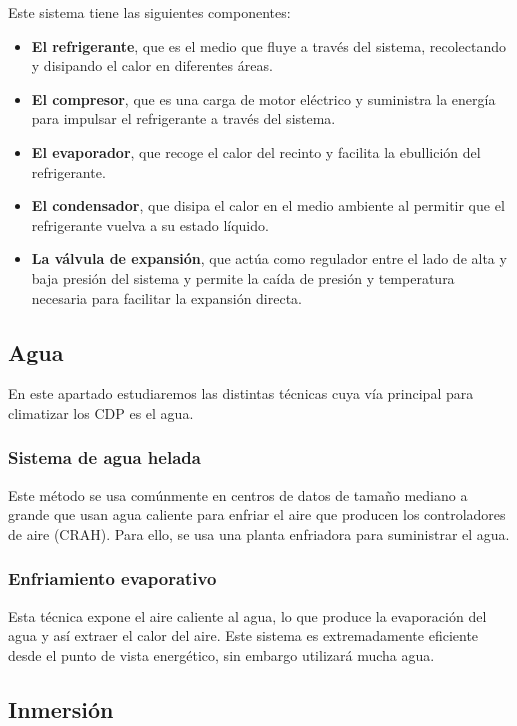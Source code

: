 Este sistema tiene las siguientes componentes:

\begin{itemize}
    \item {\textbf{El refrigerante}}, que es el medio que fluye a través del sistema, recolectando y disipando el calor en diferentes áreas.
    \item \textbf{El compresor}, que es una carga de motor eléctrico y suministra la energía para impulsar el refrigerante a través del sistema.
    \item \textbf{El evaporador}, que recoge el calor del recinto y facilita la ebullición del refrigerante.
    \item \textbf{El condensador}, que disipa el calor en el medio ambiente al permitir que el refrigerante vuelva a su estado líquido.
    \item \textbf{La válvula de expansión}, que actúa como regulador entre el lado de alta y baja presión del sistema y permite la caída de presión y temperatura necesaria para facilitar la expansión directa.
\end{itemize}

\subsection{Agua}

En este apartado estudiaremos las distintas técnicas cuya vía principal para climatizar los CDP es el agua.

\subsubsection{Sistema de agua helada}

Este método se usa comúnmente en centros de datos de tamaño mediano a grande que usan agua caliente para enfriar el aire que producen los controladores de aire (CRAH). Para ello, se usa una planta enfriadora para suministrar el agua.

\subsubsection{Enfriamiento evaporativo}

Esta técnica expone el aire caliente al agua, lo que produce la evaporación del agua y así extraer el calor del aire. Este sistema es extremadamente eficiente desde el punto de vista energético, sin embargo utilizará mucha agua.

\subsection{Inmersión}

